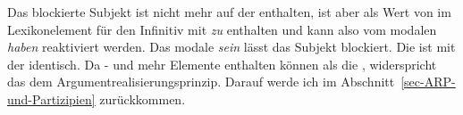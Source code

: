 {\noindent
Das blockierte Subjekt ist nicht mehr auf der \argst enthalten, ist aber als Wert von \subj im
Lexikonelement für den Infinitiv mit \emph{zu} enthalten und kann also vom modalen \emph{haben}
reaktiviert werden. Das modale \emph{sein} lässt das Subjekt blockiert. Die \compsl ist mit der \argstl identisch. Da \subj- und \compsl mehr Elemente
enthalten können als die \argstl, widerspricht das dem Argumentrealisierungsprinzip. Darauf werde
ich im Abschnitt~\ref{sec-ARP-und-Partizipien} zurückkommen.
%
%
\largerpage

}
